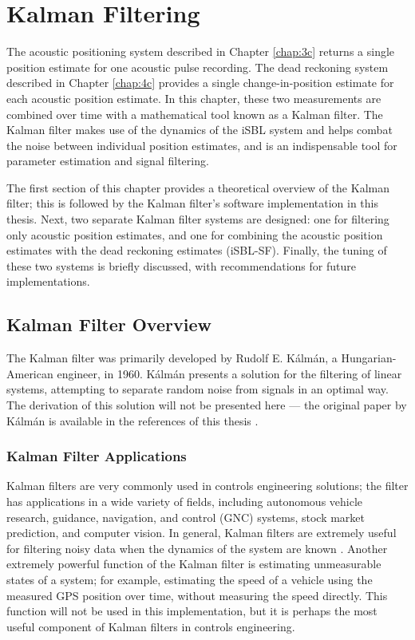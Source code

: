 \documentclass[11pt]{ucthesisCP}
\begin{document}





\chapter{Kalman Filtering} \label{chap:5c}
The acoustic positioning system described in Chapter \ref{chap:3c} returns a single position estimate for one acoustic pulse recording. The dead reckoning system described in Chapter \ref{chap:4c} provides a single change-in-position estimate for each acoustic position estimate. In this chapter, these two measurements are combined over time with a mathematical tool known as a Kalman filter. The Kalman filter makes use of the dynamics of the iSBL system and helps combat the noise between individual position estimates, and is an indispensable tool for parameter estimation and signal filtering.

The first section of this chapter provides a theoretical overview of the Kalman filter; this is followed by the Kalman filter’s software implementation in this thesis. Next, two separate Kalman filter systems are designed: one for filtering only acoustic position estimates, and one for combining the acoustic position estimates with the dead reckoning estimates (iSBL-SF). Finally, the tuning of these two systems is briefly discussed, with recommendations for future implementations.

\section{Kalman Filter Overview} \label{sec:5s1}
The Kalman filter was primarily developed by Rudolf E. Kálmán, a Hungarian-American engineer, in 1960. Kálmán presents a solution for the filtering of linear systems, attempting to separate random noise from signals in an optimal way. The derivation of this solution will not be presented here --- the original paper by Kálmán is available in the references of this thesis \cite{kalman}.

\subsection{Kalman Filter Applications} \label{ssec:5s1s1}
Kalman filters are very commonly used in controls engineering solutions; the filter has applications in a wide variety of fields, including autonomous vehicle research, guidance, navigation, and control (GNC) systems, stock market prediction, and computer vision. In general, Kalman filters are extremely useful for filtering noisy data when the dynamics of the system are known \cite{kalmanapps}. Another extremely powerful function of the Kalman filter is estimating unmeasurable states of a system; for example, estimating the speed of a vehicle using the measured GPS position over time, without measuring the speed directly. This function will not be used in this implementation, but it is perhaps the most useful component of Kalman filters in controls engineering.
\end{document}
